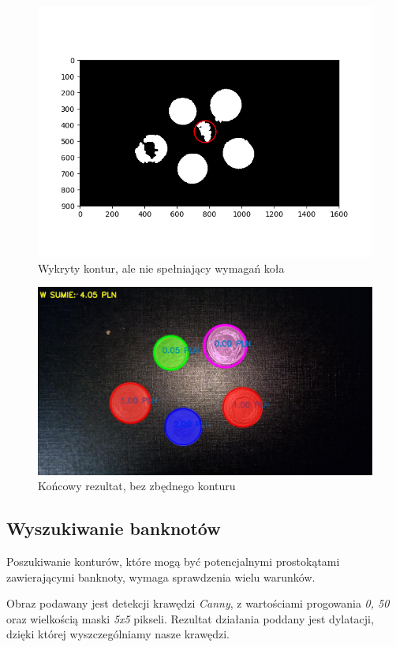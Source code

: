 \documentclass{mwart}
\begin{document}
\begin{figure}[H]
    \centering
    \includegraphics[width=\textwidth]{Area.png}
    \caption{Wykryty kontur, ale nie spełniający wymagań koła}
\end{figure}
\begin{figure}[H]
    \centering
    \includegraphics[width=\textwidth]{bb_000.jpg}
    \caption{Końcowy rezultat, bez zbędnego konturu}
\end{figure}

\subsection{Wyszukiwanie banknotów}
Poszukiwanie konturów, które mogą być potencjalnymi prostokątami zawierającymi banknoty, wymaga sprawdzenia wielu warunków.

Obraz podawany jest detekcji krawędzi \textit{Canny}, z wartościami progowania \textit{0, 50} oraz wielkością maski \textit{5x5} pikseli. Rezultat działania poddany jest dylatacji, dzięki której wyszczególniamy nasze krawędzi.
\end{document}
